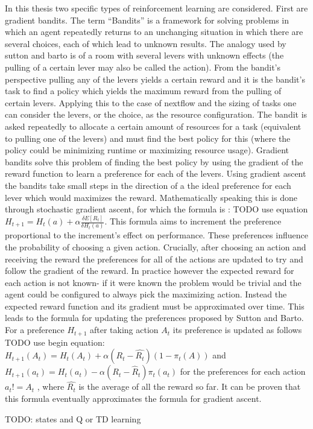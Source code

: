 In this thesis two specific types of reinforcement learning are considered. First are gradient bandits. The term ``Bandits'' is a framework for solving problems in which an agent repeatedly returns to an unchanging situation in which there are several choices, each of which lead to unknown results. The analogy used by sutton and barto is of a room with several levers with unknown effects (the pulling of a certain lever may also be called the action). From the bandit's perspective pulling any of the levers yields a certain reward and it is the bandit's task to find a policy which yields the maximum reward from the pulling of certain levers. Applying this to the case of nextflow and the sizing of tasks one can consider the levers, or the choice, as the resource configuration. The bandit is asked repeatedly to allocate a certain amount of resources for a task (equivalent to pulling one of the levers) and must find the best policy for this (where the policy could be minimizing runtime or maximizing resource usage). Gradient bandits solve this problem of finding the best policy by using the gradient of the reward function to learn a preference for each of the levers. Using gradient ascent the bandits take small steps in the direction of a the ideal preference for each lever which would maximizes the reward. Mathematically speaking this is done through stochastic gradient ascent, for which the formula is : TODO use equation $H_{t+1} = H_t(a) + \alpha \frac{ \delta E[R_t] }  {\delta H_t(a)}$. This formula aims to increment the preference proportional to the increment's effect on performance. These preferences influence the probability of choosing a given action. Crucially, after choosing an action and receiving the reward the preferences for all of the actions are updated to try and follow the gradient of the reward. In practice however the expected reward for each action is not known- if it were known the problem would be trivial and the agent could be configured to always pick the maximizing action. Instead the expected reward function and its gradient must be approximated over time. This leads to the formula for updating the preferences proposed by Sutton and Barto. For a preference $H_{t+1}$ after taking action $A_t$ its preference is updated as follows TODO use begin equation: $H_{t+1}(A_t) = H_t(A_t) + \alpha (R_t - \hat{R_t}) (1 - \pi_t(A))$ and $H_{t+1}(a_t) = H_t(a_t) - \alpha (R_t - \hat{R}_t)\pi_t(a_t)$ for the preferences for each action $a_t != A_t$ , where $\hat{R_t}$ is the average of all the reward so far. It can be proven that this formula eventually approximates the formula for gradient ascent. 

TODO: states and Q or TD learning